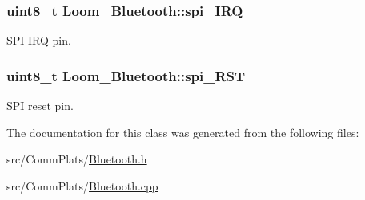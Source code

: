 \subsubsection[{\texorpdfstring{spi\+\_\+\+I\+RQ}{spi_IRQ}}]{\setlength{\rightskip}{0pt plus 5cm}uint8\+\_\+t Loom\+\_\+\+Bluetooth\+::spi\+\_\+\+I\+RQ\hspace{0.3cm}{\ttfamily [protected]}}\hypertarget{class_loom___bluetooth_a8ef44f1f6220e7272aeca00a0991a3c7}{}\label{class_loom___bluetooth_a8ef44f1f6220e7272aeca00a0991a3c7}


S\+PI I\+RQ pin. 

\subsubsection[{\texorpdfstring{spi\+\_\+\+R\+ST}{spi_RST}}]{\setlength{\rightskip}{0pt plus 5cm}uint8\+\_\+t Loom\+\_\+\+Bluetooth\+::spi\+\_\+\+R\+ST\hspace{0.3cm}{\ttfamily [protected]}}\hypertarget{class_loom___bluetooth_a9b7f8f41e29fce31bcd8366e93edd7a6}{}\label{class_loom___bluetooth_a9b7f8f41e29fce31bcd8366e93edd7a6}


S\+PI reset pin. 



The documentation for this class was generated from the following files\+:\begin{DoxyCompactItemize}
\item 
src/\+Comm\+Plats/\hyperlink{_bluetooth_8h}{Bluetooth.\+h}\item 
src/\+Comm\+Plats/\hyperlink{_bluetooth_8cpp}{Bluetooth.\+cpp}\end{DoxyCompactItemize}
